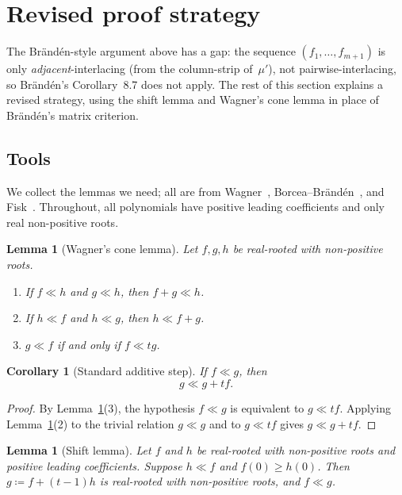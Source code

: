 \documentclass[11pt,reqno]{amsart}
\newtheorem{lemma}[theorem]{Lemma}
\newtheorem{corollary}[theorem]{Corollary}
\theoremstyle{definition}
\newcommand{\interl}{\ll}
\begin{document}
\section{Revised proof strategy}\label{sec:revised}

The Br\"and\'en-style argument above has a gap:
the sequence $(f_1, \dotsc, f_{m+1})$
is only \emph{adjacent}-interlacing (from the column-strip of~$\mu'$),
not pairwise-interlacing, so Br\"and\'en's
Corollary~8.7 does not apply.
The rest of this section explains a revised strategy,
using the shift lemma and Wagner's cone lemma in place of
Br\"and\'en's matrix criterion.

\subsection{Tools}

We collect the lemmas we need; all are from
Wagner~\cite{Wagner1992},
Borcea--Br\"and\'en~\cite{BorceaBranden2010},
and Fisk~\cite{Fisk2006x}.
Throughout, all polynomials have positive leading coefficients
and only real non-positive roots.

\begin{lemma}[Wagner's cone lemma]\label{lem:wagner}
Let $f, g, h$ be real-rooted with non-positive roots.
\begin{enumerate}
\item If $f \interl h$ and $g \interl h$, then $f + g \interl h$.
\item If $h \interl f$ and $h \interl g$, then $h \interl f + g$.
\item $g \interl f$ if and only if $f \interl tg$.
\end{enumerate}
\end{lemma}

\begin{corollary}[Standard additive step]\label{cor:add_tf}
If $f \interl g$, then
\[
  g \interl g + t f.
\]
\end{corollary}
\begin{proof}
By Lemma~\ref{lem:wagner}(3), the hypothesis $f \interl g$ is equivalent to
$g \interl t f$.
Applying Lemma~\ref{lem:wagner}(2) to the trivial relation
$g \interl g$ and to $g \interl t f$ gives
$g \interl g + t f$.
\end{proof}

\begin{lemma}[Shift lemma]\label{lem:shift}
Let $f$ and $h$ be real-rooted with non-positive roots
and positive leading coefficients.
Suppose $h \interl f$ and $f(0) \geq h(0)$.
Then $g \coloneqq f + (t-1)h$ is real-rooted with
non-positive roots, and $f \interl g$.
\end{lemma}
\end{document}
